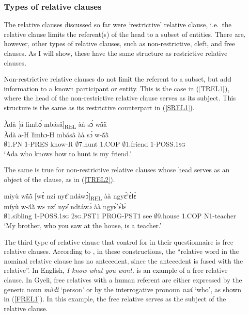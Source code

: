 \subsubsection{Types of relative clauses}
\label{sec:RELtype}


The relative clauses discussed so far were `restrictive' relative clause, i.e.\ the relative clause limits the referent(s) of the head to a subset of entities.
There are, however, other types of relative clauses, such as non-restrictive, cleft, and free clauses. As I will show, these have the same structure as restrictive relative clauses.

Non-restrictive relative clauses do not limit the referent to a subset, but add information to a known participant or entity. This is the case in (\ref{TREL1}), where the head of the non-restrictive relative clause serves as its subject. This structure is the same as its restrictive counterpart in (\ref{SREL1}).

\begin{exe}
\ex\label{TREL1}
  \glll   Àdà [á lìmbɔ́ mbásâ]\textsubscript{REL} àà sɔ́ wã́ã̀ \\
         Àdà a-H lìmbɔ-H mbásâ àà sɔ́ w-ã́ã̀ \\
         $\emptyset$1.PN 1-PRES know-R $\emptyset$7.hunt 1.COP $\emptyset$1.friend 1-POSS.1\textsc{sg}  \\
    \trans `Ada who knows how to hunt is my friend.'
\end{exe}

The same is true for non-restrictive relative clauses whose head serves as an object of the clause, as in (\ref{TREL2}).

\begin{exe}
\ex\label{TREL2}
  \glll míyù wã́ã̀ [wɛ̀ nzí nyɛ̂ ndáwɔ̀]\textsubscript{REL} àà ngyɛ́'ɛ̀lɛ̀ \\
          míyù w-ã́ã̀ wɛ nzí nyɛ̂ ndtáwɔ̀ àà ngyɛ́'ɛ̀lɛ̀ \\
         $\emptyset$1.sibling 1-POSS.1\textsc{sg} 2\textsc{sg}.PST1 PROG-PST1 see $\emptyset$9.house 1.COP N1-teacher\\
    \trans `My brother, who you saw at the house, is a teacher.'
\end{exe}



The third type of relative clause that \citet{downing2010} control for in their questionnaire is free relative clauses. According to \citet{mcarthur2005}, in these constructions, the
``relative word in the nominal relative clause has no antecedent, since the antecedent is fused with the relative''. In English, {\itshape I know what you want.} is an example of a free relative clause. In Gyeli, free relatives with a human referent are either expressed by the generic noun {\itshape mùdì} `person' or by the interrogative pronoun {\itshape nzá} `who', as shown in (\ref{FREL1}). In this example, the free relative serves as the subject of the relative clause.

